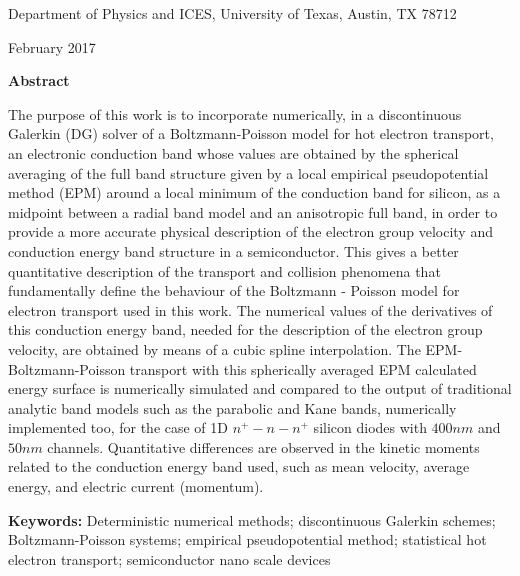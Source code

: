 \documentclass[11pt]{article}
\begin{document}
\smallskip

\centerline{Department of Physics and ICES, University of Texas,
Austin, TX 78712}

\bigskip

\centerline{February 2017}

\newpage

\vspace{.4in}

\centerline{\bf Abstract}

\vspace{.16in}

The purpose of this work is to incorporate numerically, in a discontinuous Galerkin (DG) solver of a 
Boltzmann-Poisson model for hot electron transport, an electronic conduction band whose values are 
obtained by the spherical averaging of the full band structure given by a 
local empirical 
pseudopotential method (EPM) around a local minimum of the conduction 
band for silicon, as a 
midpoint between a radial band model and an anisotropic full band, in order to provide a more 
accurate physical description of the electron group velocity and conduction energy band structure in 
a semiconductor. 
This gives a better quantitative description of the transport and collision phenomena
that fundamentally define the behaviour of the Boltzmann - Poisson model for electron transport used in this work. 
The numerical values of the derivatives of this conduction energy band, needed for the 
description of the electron group velocity, are obtained by means of a 
cubic spline interpolation. 
The EPM-Boltzmann-Poisson transport with this spherically averaged EPM 
calculated energy surface is 
numerically simulated and compared to the output of traditional analytic 
band models such as the 
parabolic and Kane bands, numerically implemented too, for the case of 
1D $n^+-n-n^+$ silicon 
diodes with $400nm$ and $50nm$ channels. Quantitative differences are
observed in the kinetic moments related to the conduction energy band 
used, such as mean velocity, average energy, and electric current (momentum).

\vfill

{\bf Keywords:} Deterministic numerical methods; discontinuous Galerkin 
schemes; Boltzmann-Poisson systems; empirical pseudopotential method;
statistical hot electron transport; semiconductor nano scale devices

\vfill

\newpage
\end{document}

